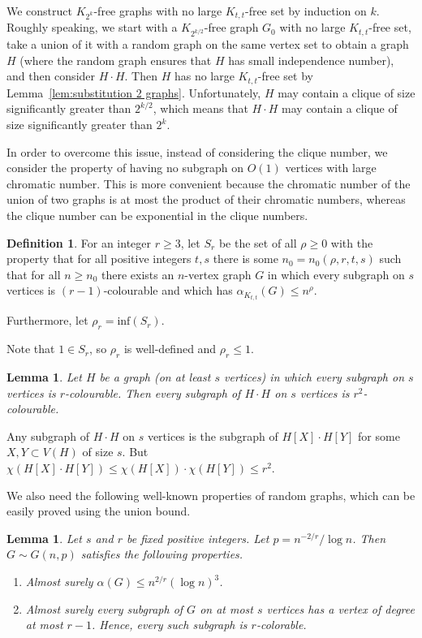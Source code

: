\documentclass[11pt]{article}
\let\oldendproof\endproof
\renewenvironment{proof}[1][\proofname]{\oldproof[\bf #1]}{\oldendproof}
\theoremstyle{plain}
\newtheorem{lemma}[theorem]{Lemma}
\theoremstyle{definition}
\newtheorem{definition}[theorem]{Definition}
\begin{document}
    We construct $K_{2^k}$-free graphs with no large $K_{t,t}$-free set by induction on $k$. Roughly speaking, we start with a $K_{2^{k/2}}$-free graph $G_0$ with no large $K_{t,t}$-free set,
     take a union of it with a random graph on the same vertex set to obtain a graph $H$ (where the random graph ensures that $H$ has small independence number), and then consider $H\cdot H$. Then $H$ has no large $K_{t,t}$-free set by Lemma~\ref{lem:substitution 2 graphs}. Unfortunately, $H$ may contain a clique of size significantly greater than $2^{k/2}$, which means that $H\cdot H$ may contain a clique of size significantly greater than $2^k$.

     
	In order to overcome this issue, instead of considering the clique number, we consider the property of having no subgraph on $O(1)$ vertices with large chromatic number. This is more convenient because the chromatic number of the union of two graphs is at most the product of their chromatic numbers, whereas the clique number can be exponential in the clique numbers.

 \begin{definition}
     For an integer $r\geq 3$, let $S_r$ be the set of all $\rho\geq 0$ with the property that for all positive integers $t,s$ there is some $n_0=n_0(\rho,r,t,s)$ such that for all $n\geq n_0$ there exists an $n$-vertex graph $G$ in which every subgraph on $s$ vertices is $(r-1)$-colourable and which has $\alpha_{K_{t,t}}(G)\leq n^{\rho}$.

     Furthermore, let $\rho_r=\textrm{inf}(S_r)$.
 \end{definition}
\noindent 
Note that $1\in S_r$, so $\rho_r$ is well-defined and $\rho_r\leq 1$.

\begin{lemma} \label{lem:product chromatic}
    Let $H$ be a graph (on at least $s$ vertices) in which every subgraph on $s$ vertices is $r$-colourable. Then every subgraph of $H\cdot H$ on $s$ vertices is $r^2$-colourable.
\end{lemma}

\begin{proof}
    Any subgraph of $H\cdot H$ on $s$ vertices is the subgraph of $H[X]\cdot H[Y]$ for some $X,Y\subset V(H)$ of size $s$. But $\chi(H[X]\cdot H[Y])\leq \chi(H[X])\cdot \chi(H[Y])\leq r^2$.
\end{proof}
 
	We also need the following well-known properties of random graphs, which can be easily proved using the union bound.
	\begin{lemma}\label{lem:random graph properties}
		Let $s$ and $r$ be fixed positive integers. Let $p=n^{-2/r}/\log n$. Then $G \sim G(n,p)$ satisfies the following properties.
		\begin{enumerate}
			\item Almost surely $\alpha(G) \leq n^{2/r}(\log n)^3$. 
			\item Almost surely every subgraph of $G$ on at most $s$ vertices has a vertex of degree at most $r-1$. Hence, every such subgraph is $r$-colorable. 
		\end{enumerate}
	\end{lemma}
\end{document}
